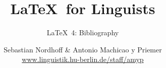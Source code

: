 


\title{
	\LaTeX\ for Linguists
}

\subtitle{\LaTeX\ 4: Bibliography}

\author[aMyP]{
	{\small Sebastian Nordhoff \& Antonio Machicao y Priemer}
	\\
	{\footnotesize \url{www.linguistik.hu-berlin.de/staff/amyp}}
}








\begin{frame}
  \HUtitle
\end{frame}





\nocite{Freitag&MyP15a}
\nocite{Knuth1986}
\nocite{Kopka94a}
\nocite{MyP17c}
\nocite{MyP&Kerkhof16a}
	


%
%
%
%
%


